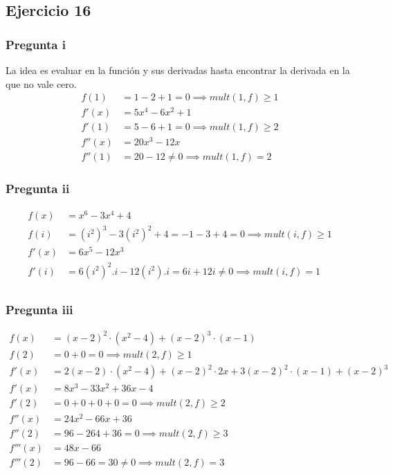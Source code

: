 \subsection{Ejercicio 16}

\subsubsection{Pregunta i}
La idea es evaluar en la función y sus derivadas hasta encontrar la derivada en la que no vale cero.
\begin{align*}
    f(1) &= 1-2+1 = 0 \implies mult(1,f) \geq 1 \\
    f'(x) &= 5x^4 - 6x^2 + 1 \\
    f'(1) &= 5-6+1 = 0 \implies mult(1,f) \geq 2 \\
    f''(x) &= 20x^3 - 12x \\
    f''(1) &= 20-12 \neq 0 \implies mult(1,f) = 2
\end{align*}

\subsubsection{Pregunta ii}
\begin{align*}
    f(x) &= x^6 - 3x^4 + 4 \\
    f(i) &= (i^2)^3 - 3(i^2)^2 + 4 = -1-3+4 = 0 \implies mult(i,f) \geq 1 \\
    f'(x) &= 6x^5 - 12x^3 \\
    f'(i) &= 6(i^2)^2 . i - 12(i^2).i = 6i+12i \neq 0 \implies mult(i,f) = 1 \\
\end{align*}

\subsubsection{Pregunta iii}
\begin{align*}
    f(x) &= (x-2)^2 \cdot (x^2-4) + (x-2)^3 \cdot (x-1) \\
    f(2) &= 0 + 0 = 0 \implies mult(2,f) \geq 1 \\
    f'(x) &= 2(x-2) \cdot (x^2-4) + (x-2)^2 \cdot 2x + 3(x-2)^2 \cdot (x-1) + (x-2)^3 \\
    f'(x) &= 8x^3 -33x^2 +36x -4 \\
    f'(2) &= 0 + 0 + 0 + 0 = 0 \implies mult(2,f) \geq 2 \\
    f''(x) &= 24x^2 -66x +36 \\
    f''(2) &= 96 -264 +36 = 0 \implies mult(2,f) \geq 3 \\
    f'''(x) &= 48x - 66 \\
    f'''(2) &= 96 - 66 = 30 \neq 0 \implies mult(2,f) = 3 \\
\end{align*}

